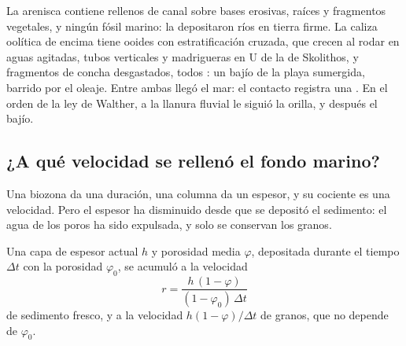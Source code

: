 \begin{omfigure}
\par{}
\end{omfigure}

\begin{example}\label{ex:b2:palaeoenvironments:base}
La arenisca contiene rellenos de canal sobre bases erosivas, raíces y fragmentos vegetales, y ningún fósil
marino: la depositaron ríos en tierra firme. La caliza oolítica de encima tiene ooides con estratificación cruzada,
que crecen al rodar en aguas agitadas, tubos verticales y madrigueras en U de la  de Skolithos,
y fragmentos de concha desgastados, todos : un bajío de la playa sumergida,
barrido por el oleaje. Entre ambas llegó el mar: el contacto registra una . En
el orden de la ley de Walther, a la llanura fluvial le siguió la orilla, y después el bajío.
\end{example}

\subsection*{¿A qué velocidad se rellenó el fondo marino?}

Una biozona da una duración, una columna da un espesor, y su cociente es una velocidad. Pero el
espesor ha disminuido desde que se depositó el sedimento: el agua de los poros ha sido expulsada,
y solo se conservan los granos.

\begin{proposition}\label{prop:b2:palaeoenvironments:rate}
Una capa de espesor actual $h$ y porosidad media $\varphi$, depositada durante el tiempo $\Delta t$
con la porosidad $\varphi_0$, se acumuló a la velocidad
\[
  r = \frac{h\,(1 - \varphi)}{(1 - \varphi_0)\,\Delta t}
\]
de sedimento fresco, y a la velocidad $h(1-\varphi)/\Delta t$ de granos, que no depende de
$\varphi_0$.
\end{proposition}

